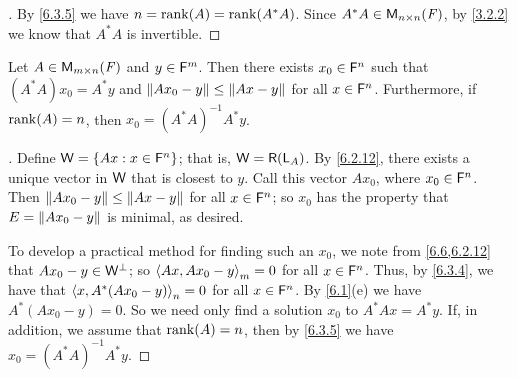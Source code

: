 \begin{proof}[]
  By \cref{6.3.5} we have \(n = \rk{A} = \rk{A^* A}\).
  Since \(A^* A \in \mathsf{M}_{{n} \times n}({\mathit{F}})\), by \cref{3.2.2} we know that \(A^* A\) is invertible.
\end{proof}

\begin{thm}\label{6.12}
  Let \(A \in \mathsf{M}_{{m} \times n}({\mathit{F}})\) and \(y \in \mathsf{F}^m\).
  Then there exists \(x_0 \in \mathsf{F}^n\) such that \((A^* A) x_0 = A^* y\) and \(\left\lVert A x_0 - y\right\rVert \leq \left\lVert Ax - y\right\rVert\) for all \(x \in \mathsf{F}^n\).
  Furthermore, if \(\rk{A} = n\), then \(x_0 = (A^* A)^{-1} A^* y\).
\end{thm}

\begin{proof}[]
  Define \(\mathsf{W} = \left\lbrace Ax : x \in \mathsf{F}^n\right\rbrace\);
  that is, \(\W = \rg{\L_A}\).
  By \cref{6.2.12}, there exists a unique vector in \(\mathsf{W}\) that is closest to \(y\).
  Call this vector \(A x_0\), where \(x_0 \in \mathsf{F}^n\).
  Then \(\left\lVert A x_0 - y\right\rVert \leq \left\lVert Ax - y\right\rVert\) for all \(x \in \mathsf{F}^n\);
  so \(x_0\) has the property that \(E = \left\lVert A x_0 - y\right\rVert\) is minimal, as desired.

  To develop a practical method for finding such an \(x_0\), we note from \cref{6.6,6.2.12} that \(A x_0 - y \in \mathsf{W}^{\perp}\);
  so \(\left\langle Ax, A x_0 - y\right\rangle_m = 0\) for all \(x \in \mathsf{F}^n\).
  Thus, by \cref{6.3.4}, we have that \(\left\langle x, A^* (A x_0 - y)\right\rangle_n = 0\) for all \(x \in \mathsf{F}^n\).
  By \cref{6.1}(e) we have \(A^* (A x_0 - y) = 0\).
  So we need only find a solution \(x_0\) to \(A^* Ax = A^* y\).
  If, in addition, we assume that \(\rk{A} = n\), then by \cref{6.3.5} we have \(x_0 = (A^* A)^{-1} A^* y\).
\end{proof}


